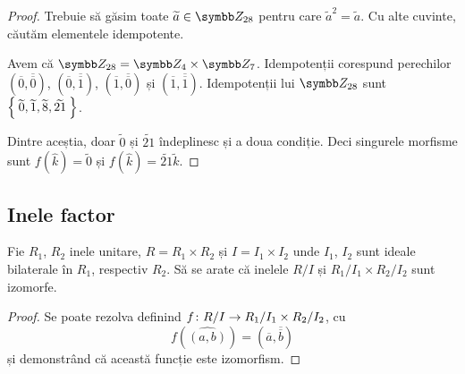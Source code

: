 \begin{exercise}[3.11]
\begin{itemize}
\begin{proof}
        Trebuie să găsim toate \(\widetilde{a} \in \integersmod{28}\) pentru care \(\widetilde{a}^2 = \widetilde{a}\). Cu alte cuvinte, căutăm elementele idempotente.
        
        Avem că \(\integersmod{28} = \integersmod{4} \times \integersmod{7}\). Idempotenții corespund perechilor \((\overline{0}, \overline{\overline{0}})\), \((\overline{0}, \overline{\overline{1}})\), \((\overline{1}, \overline{\overline{0}})\) și \((\overline{1}, \overline{\overline{1}})\). Idempotenții lui \(\integersmod{28}\) sunt \(\Set{ \widetilde{0}, \widetilde{1}, \widetilde{8}, \widetilde{21} }\).
        
        Dintre aceștia, doar \(\widetilde{0}\) și \(\widetilde{21}\) îndeplinesc și a doua condiție. Deci singurele morfisme sunt \(f(\widehat{k}) = \widetilde{0}\) și \(f(\widehat{k}) = \widetilde{21} \widetilde{k}\).
    \end{proof}
\end{itemize}
\end{exercise}

\subsection{Inele factor}

\begin{exercise}[4.8]
Fie \(R_1\), \(R_2\) inele unitare, \(R = R_1 \times R_2\) și \(I = I_1 \times I_2\) unde \(I_1\), \(I_2\) sunt ideale bilaterale în \(R_1\), respectiv \(R_2\). Să se arate că inelele \(R/I\) și \(R_1/I_1 \times R_2/I_2\) sunt izomorfe.
\end{exercise}
\begin{proof}
Se poate rezolva definind \(f \colon R/I \to R_1/I_1 \times R_2/I_2\), cu
\[
    f(\widehat{(a, b)}) = (\overline{a}, \overline{\overline{b}})
\]
și demonstrând că această funcție este izomorfism.
\end{proof}

